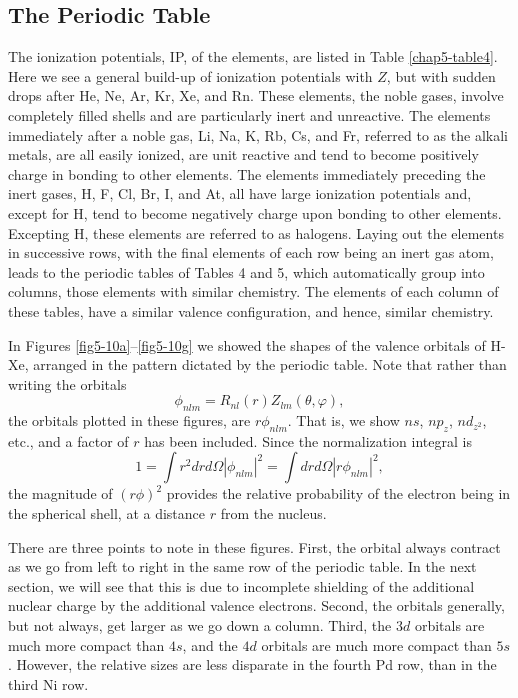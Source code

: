 \subsection{The Periodic Table}
The ionization potentials, IP, of the elements, are listed in Table
\ref{chap5-table4}.  Here we see a general build-up of ionization
potentials with $Z$, but with sudden drops after He, Ne, Ar, Kr, Xe,
and Rn. These elements, the noble gases, involve completely filled
shells and are particularly inert and unreactive. The elements
immediately after a noble gas, Li, Na, K, Rb, Cs, and Fr, referred to
as the alkali metals, are all easily ionized, are unit reactive and
tend to become positively charge in bonding to other elements. The
elements immediately preceding the inert gases, H, F, Cl, Br, I, and
At, all have large ionization potentials and, except for H, tend to
become negatively charge upon bonding to other elements.  Excepting H,
these elements are referred to as halogens. Laying out the elements in
successive rows, with the final elements of each row being an inert
gas atom, leads to the periodic tables of Tables 4 and 5, which
automatically group into columns, those elements with similar
chemistry. The elements of each column of these tables, have a similar
valence configuration, and hence, similar chemistry.

In Figures \ref{fig5-10a}--\ref{fig5-10g} we showed the shapes of the
valence orbitals of H-Xe, arranged in the pattern dictated by the
periodic table.  Note that rather than writing the orbitals
\begin{equation}
\phi_{nlm} = R_{nl} (r) Z_{lm} ( \theta , \varphi ) ,
\end{equation}
the orbitals plotted in these figures, are $r \phi_{nlm}$.  That is,
we show $ns$, $np_z$, $nd_{z^2}$, etc., and a factor of $r$ has been
included. Since the normalization integral is
\begin{equation}
1 = \int r^2 drd \Omega | \phi_{nlm} |^2 = \int drd \Omega | r 
\phi_{nlm} |^2 ,
\end{equation}
the magnitude of $(r \phi)^2$ provides the relative probability of the 
electron being in the spherical shell, at a distance $r$ from the nucleus.

There are three points to note in these figures. First, the orbital
always contract as we go from left to right in the same row of the
periodic table.  In the next section, we will see that this is due to
incomplete shielding of the additional nuclear charge by the
additional valence electrons.  Second, the orbitals generally, but not
always, get larger as we go down a column.  Third, the $3d$ orbitals
are much more compact than $4s$, and the $4d$ orbitals are much more
compact than $5s$.  However, the relative sizes are less disparate in
the fourth Pd row, than in the third Ni row.

